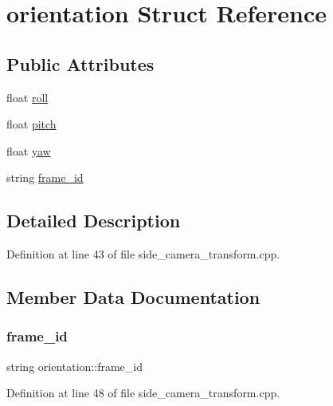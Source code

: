 \hypertarget{structorientation}{}\section{orientation Struct Reference}
\label{structorientation}
\subsection*{Public Attributes}
\begin{DoxyCompactItemize}
\item 
float \mbox{\hyperlink{structorientation_a898c022734d840857dbd6a57b61779b9}{roll}}
\item 
float \mbox{\hyperlink{structorientation_adb5d633237f135eaf9a1ad6ea579d937}{pitch}}
\item 
float \mbox{\hyperlink{structorientation_a63e111fa80781bc0a939bff680c49a68}{yaw}}
\item 
string \mbox{\hyperlink{structorientation_a3f1d635d32706f5f60909107ca1d0a85}{frame\+\_\+id}}
\end{DoxyCompactItemize}


\subsection{Detailed Description}


Definition at line 43 of file side\+\_\+camera\+\_\+transform.\+cpp.



\subsection{Member Data Documentation}
\mbox{\label{structorientation_a3f1d635d32706f5f60909107ca1d0a85}} 
\subsubsection{\texorpdfstring{frame\_id}{frame\_id}}
{\footnotesize\ttfamily string orientation\+::frame\+\_\+id}



Definition at line 48 of file side\+\_\+camera\+\_\+transform.\+cpp.

\mbox{\label{structorientation_adb5d633237f135eaf9a1ad6ea579d937}} 
